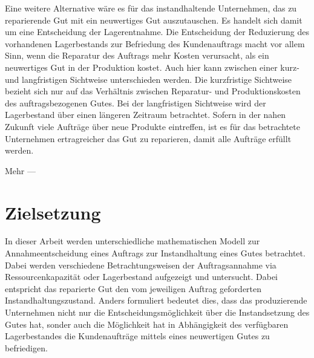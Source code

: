 Eine weitere Alternative wäre es für das instandhaltende Unternehmen, das zu reparierende Gut mit ein neuwertiges Gut auszutauschen. Es handelt sich damit um eine Entscheidung der Lagerentnahme. Die Entscheidung der Reduzierung des vorhandenen Lagerbestands zur Befriedung des Kundenauftrags macht vor allem Sinn, wenn die Reparatur des Auftrags mehr Kosten verursacht, als ein neuwertiges Gut in der Produktion kostet. Auch hier kann zwischen einer kurz- und langfristigen Sichtweise unterschieden werden. Die kurzfristige Sichtweise bezieht sich nur auf das Verhältnis zwischen Reparatur- und Produktionskosten des auftragsbezogenen Gutes. Bei der langfristigen Sichtweise wird der Lagerbestand über einen längeren Zeitraum betrachtet. Sofern in der nahen Zukunft viele Aufträge über neue Produkte eintreffen, ist es für das betrachtete Unternehmen ertragreicher das Gut zu reparieren, damit alle Aufträge erfüllt werden.

Mehr ---




\section{Zielsetzung}

In dieser Arbeit werden unterschiedliche mathematischen Modell zur Annahmeentscheidung eines Auftrags zur Instandhaltung eines Gutes betrachtet. Dabei werden verschiedene Betrachtungsweisen der Auftragsannahme via Ressourcenkapazität oder Lagerbestand aufgezeigt und untersucht. %
Dabei entspricht das reparierte Gut den vom jeweiligen Auftrag geforderten Instandhaltungszustand. Anders formuliert bedeutet dies, dass das produzierende Unternehmen nicht nur die Entscheidungsmöglichkeit über die Instandsetzung des Gutes hat, sonder auch die Möglichkeit hat in Abhängigkeit des verfügbaren Lagerbestandes die Kundenaufträge mittels eines neuwertigen Gutes zu befriedigen.


